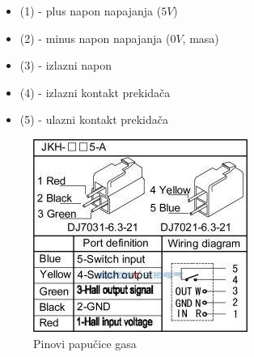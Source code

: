 \begin{itemize}
	\item (1) - plus napon napajanja ($5V$)
	\item (2) - minus napon napajanja ($0V$, masa)
	\item (3) - izlazni napon
	\item (4) - izlazni kontakt prekidača
	\item (5) - ulazni kontakt prekidača
\end{itemize}

\begin{figure}
\centering
\includegraphics[scale=1]{slike/foot_throttle.png}
\caption{Pinovi papučice gasa}
\label{fig:gas}
\end{figure}

